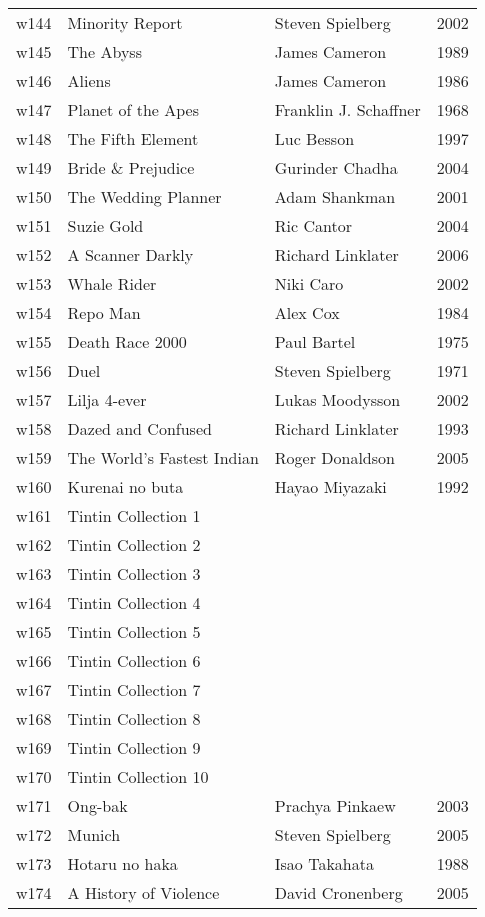 \documentclass{article}
\begin{document}
\begin {center}
\begin{longtable}{l p{10cm} l l}
w144 & Minority Report & Steven Spielberg & 2002 \\
w145 & The Abyss & James Cameron & 1989 \\
w146 & Aliens & James Cameron & 1986 \\
w147 & Planet of the Apes & Franklin J. Schaffner & 1968 \\
w148 & The Fifth Element & Luc Besson & 1997 \\
w149 & Bride \& Prejudice & Gurinder Chadha & 2004 \\
w150 & The Wedding Planner & Adam Shankman & 2001 \\
w151 & Suzie Gold & Ric Cantor & 2004 \\
w152 & A Scanner Darkly & Richard Linklater & 2006 \\
w153 & Whale Rider & Niki Caro & 2002 \\
w154 & Repo Man & Alex Cox & 1984 \\
w155 & Death Race 2000 & Paul Bartel & 1975 \\
w156 & Duel & Steven Spielberg & 1971 \\
w157 & Lilja 4-ever & Lukas Moodysson & 2002 \\
w158 & Dazed and Confused & Richard Linklater & 1993 \\
w159 & The World's Fastest Indian & Roger Donaldson & 2005 \\
w160 & Kurenai no buta & Hayao Miyazaki & 1992 \\
w161 & Tintin Collection 1 &  &  \\
w162 & Tintin Collection 2 &  &  \\
w163 & Tintin Collection 3 &  &  \\
w164 & Tintin Collection 4 &  &  \\
w165 & Tintin Collection 5 &  &  \\
w166 & Tintin Collection 6 &  &  \\
w167 & Tintin Collection 7 &  &  \\
w168 & Tintin Collection 8 &  &  \\
w169 & Tintin Collection 9 &  &  \\
w170 & Tintin Collection 10 &  &  \\
w171 & Ong-bak & Prachya Pinkaew & 2003 \\
w172 & Munich & Steven Spielberg & 2005 \\
w173 & Hotaru no haka & Isao Takahata & 1988 \\
w174 & A History of Violence & David Cronenberg & 2005 \\

\end{longtable}
\end{center}
\end{document}
